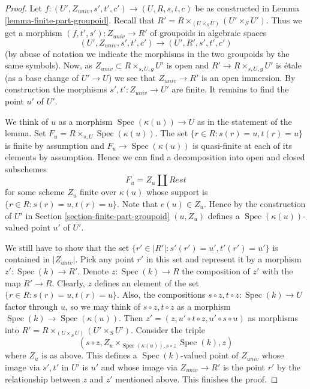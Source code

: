 \documentclass{stacks-project}
\theoremstyle{plain}
\theoremstyle{definition}
\theoremstyle{remark}
\numberwithin{equation}{subsection}
\def\Spec{\mathop{\mathrm{Spec}}}
\begin{document}
\begin{proof}
Let $f : (U', Z_{univ}, s', t', c') \to (U, R, s, t, c)$ be as constructed in
Lemma \ref{lemma-finite-part-groupoid}.
Recall that $R' = R \times_{(U \times_S U)} (U' \times_S U')$.
Thus we get a morphism $(f, t', s') : Z_{univ} \to R'$ of groupoids
in algebraic spaces
$$
(U', Z_{univ}, s', t', c') \to (U', R', s', t', c')
$$
(by abuse of notation we indicate the morphisms in the two groupoids
by the same symbols). Now, as $Z_{univ} \subset R \times_{s, U, g} U'$ is open
and $R' \to R \times_{s, U, g} U'$ is \'etale (as a base change
of $U' \to U$) we see that $Z_{univ} \to R'$ is an open immersion.
By construction the morphisms $s', t' : Z_{univ} \to U'$ are finite.
It remains to find the point $u'$ of $U'$.

\medskip\noindent
We think of $u$ as a morphism $\Spec(\kappa(u)) \to U$ as in
the statement of the lemma. Set $F_u = R \times_{s, U} \Spec(\kappa(u))$.
The set $\{r \in R : s(r) = u, t(r) = u\}$ is finite by assumption
and $F_u \to \Spec(\kappa(u))$ is quasi-finite at each
of its elements by assumption. Hence we can find a decomposition into
open and closed subschemes
$$
F_u = Z_u \amalg Rest
$$
for some scheme $Z_u$ finite over $\kappa(u)$ whose support is
$\{r \in R : s(r) = u, t(r) = u\}$. Note that $e(u) \in Z_u$.
Hence by the construction of $U'$ in
Section \ref{section-finite-part-groupoid}
$(u, Z_u)$ defines a $\Spec(\kappa(u))$-valued
point $u'$ of $U'$.

\medskip\noindent
We still have to show that the set
$\{r' \in |R'| : s'(r') = u', t'(r') = u'\}$
is contained in $|Z_{univ}|$.
Pick any point $r'$ in this set and represent it by a morphism
$z' : \Spec(k) \to R'$. Denote $z : \Spec(k) \to R$
the composition of $z'$ with the map $R' \to R$.
Clearly, $z$ defines an element of the set
$\{r \in R : s(r) = u, t(r) = u\}$.
Also, the compositions $s \circ z, t \circ z : \Spec(k) \to U$
factor through $u$, so we may think of $s \circ z, t \circ z$
as a morphism $\Spec(k) \to \Spec(\kappa(u))$. Then
$z' = (z, u' \circ t \circ z, u'\circ s \circ u)$ as morphisms into
$R' = R \times_{(U \times_S U)} (U' \times_S U')$.
Consider the triple
$$
(s \circ z, Z_u \times_{\Spec(\kappa(u)), s \circ z} \Spec(k), z)
$$
where $Z_u$ is as above. This defines a $\Spec(k)$-valued point
of $Z_{univ}$ whose image via $s', t'$ in $U'$ is $u'$ and
whose image via
$Z_{univ} \to R'$ is the point $r'$ by the relationship between
$z$ and $z'$ mentioned above.
This finishes the proof.
\end{proof}
\end{document}
